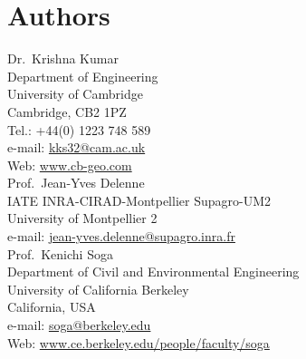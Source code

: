\documentclass[12pt,twoside]{tuhhproc-en}
\begin{document}
\section*{Authors}\small
Dr.\ Krishna Kumar\\
Department of Engineering \\
University of Cambridge \\
Cambridge, CB2 1PZ\\
Tel.: +44(0) 1223 748 589\\
e-mail: \url{kks32@cam.ac.uk}\\
Web: \url{www.cb-geo.com}\\

Prof.\ Jean-Yves Delenne\\
IATE INRA-CIRAD-Montpellier Supagro-UM2\\
University of Montpellier 2 \\
e-mail: \url{jean-yves.delenne@supagro.inra.fr}\\

Prof.\ Kenichi Soga\\
Department of Civil and Environmental Engineering \\
University of California Berkeley \\
California, USA\\
e-mail: \url{soga@berkeley.edu}\\
Web: \url{www.ce.berkeley.edu/people/faculty/soga}\\
\end{document}
